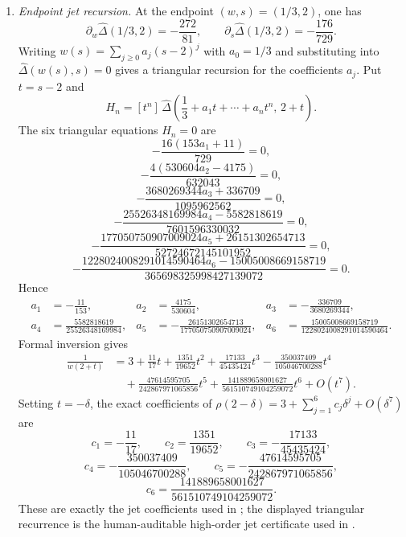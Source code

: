 \begin{enumerate}[label=(\alph*)]
  \item \textit{Endpoint jet recursion.}\quad
    At the endpoint \((w,s)=(1/3,2)\), one has
    \[
      \partial_w\widehat\Delta(1/3,2)=-\frac{272}{81},
      \qquad
      \partial_s\widehat\Delta(1/3,2)=-\frac{176}{729}.
    \]
    Writing \(w(s)=\sum_{j\ge 0}a_j(s-2)^j\) with \(a_0=1/3\) and
    substituting into \(\widehat\Delta(w(s),s)=0\) gives a triangular
    recursion for the coefficients \(a_j\). Put \(t=s-2\) and
    \[
      H_n=[t^n]\,
      \widehat\Delta\!\left(
        \frac13+a_1t+\cdots+a_nt^n,\,2+t
      \right).
    \]
    The six triangular equations \(H_n=0\) are
    \[
      -\frac{16(153a_1+11)}{729}=0,
    \]
    \[
      -\frac{4(530604a_2-4175)}{632043}=0,
    \]
    \[
      -\frac{3680269344a_3+336709}{1095962562}=0,
    \]
    \[
      -\frac{25526348169984a_4-5582818619}{7601596330032}=0,
    \]
    \[
      -\frac{177050750907009024a_5+26151302654713}
             {52724672145101952}=0,
    \]
    \[
      -\frac{1228024008291014590464a_6-15005008669158719}
             {365698325998427139072}=0.
    \]
    Hence
    \[
    \begin{aligned}
      a_1&=-\frac{11}{153},&
      a_2&=\frac{4175}{530604},&
      a_3&=-\frac{336709}{3680269344},\\
      a_4&=\frac{5582818619}{25526348169984},&
      a_5&=-\frac{26151302654713}{177050750907009024},&
      a_6&=\frac{15005008669158719}{1228024008291014590464}.
    \end{aligned}
    \]
    Formal inversion gives
    \[
    \begin{aligned}
      \frac1{w(2+t)}
      &=3+\frac{11}{17}t+\frac{1351}{19652}t^2
        +\frac{17133}{45435424}t^3
        -\frac{350037409}{105046700288}t^4\\
      &\quad
        +\frac{47614595705}{242867971065856}t^5
        +\frac{141889658001627}{561510749104259072}t^6
        +O(t^7).
    \end{aligned}
    \]
    Setting \(t=-\delta\), the exact coefficients of
    \(\rho(2-\delta)=3+\sum_{j=1}^6 c_j\delta^j+O(\delta^7)\) are
    \[
      c_1=-\frac{11}{17},\qquad
      c_2=\frac{1351}{19652},\qquad
      c_3=-\frac{17133}{45435424},
    \]
    \[
      c_4=-\frac{350037409}{105046700288},\qquad
      c_5=-\frac{47614595705}{242867971065856},
    \]
    \[
      c_6=\frac{141889658001627}{561510749104259072}.
    \]
    These are exactly the jet coefficients used in
    ; the displayed triangular recurrence
    is the human-auditable high-order jet certificate used in
    .


\end{enumerate}
